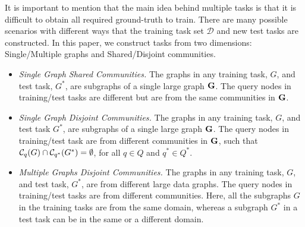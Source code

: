 
It is important to mention that the main idea behind multiple tasks is
that it is difficult to obtain all required ground-truth to train.
There are many possible scenarios with different ways that the
training task set $\mathcal{D}$ and new test tasks are constructed.
%
%
In this paper, we construct tasks from two dimensions: Single/Multiple
graphs and Shared/Disjoint communities.
%
%
%



\begin{itemize}[noitemsep,topsep=0pt,parsep=5pt,partopsep=0pt,leftmargin=*]
\item {\sl Single Graph Shared Communities.}
The graphs in any training task, $G$, and test task, $G^*$, are
subgraphs of a single large graph ${\bf G}$. The query nodes in
training/test tasks are different but are from the same communities in
${\bf G}$.

\item {\sl Single Graph Disjoint Communities.}
The graphs in any training task, $G$, and test task $G^*$, are
subgraphs of a single large graph ${\bf G}$. The query nodes in
training/test task are from different communities in ${\bf G}$, such
that $\mathcal{C}_{q}(G) \cap \mathcal{C}_{q^*}(G^*) = \emptyset$, for
all $q \in Q$ and $q^* \in Q^*$.

\item {\sl Multiple Graphs Disjoint Communities.}
The graphs in any training task, $G$, and test task, $G^*$, are from
different large data graphs. The query nodes in training/test tasks
are from different communities.  Here, all the subgraphs $G$ in the
training tasks are from the same domain, whereas a subgraph $G^*$ in a
test task can be in the same or a different domain.
%  
\end{itemize}

